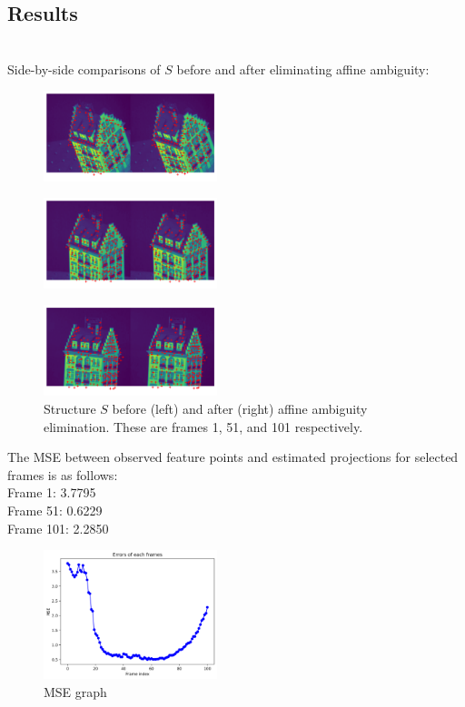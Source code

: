 {\subsection{Results}
\\Side-by-side comparisons of \( S \) before and after eliminating affine ambiguity:
\newpage
\begin{figure}[h!]
	\centering
	\includegraphics[width=0.45\textwidth]{./student_response/results/k00000001.png}
\end{figure}
\begin{figure}[h!]
	\centering
	\includegraphics[width=0.45\textwidth]{./student_response/results/k00000051.png}
\end{figure}
\begin{figure}[h!]
	\centering
	\includegraphics[width=0.45\textwidth]{./student_response/results/k00000101.png}
	\caption{Structure \( S \) before (left) and after (right) affine ambiguity elimination. These are frames 1, 51, and 101 respectively.}
\end{figure}
The MSE between observed feature points and estimated projections for selected frames is as follows:
\\Frame 1: 3.7795
\\Frame 51: 0.6229
\\Frame 101: 2.2850

\begin{figure}[h!]
	\centering
	\includegraphics[width=0.45\textwidth]{./student_response/results/mse}
	\caption{MSE graph}
\end{figure}
\newpage
}
